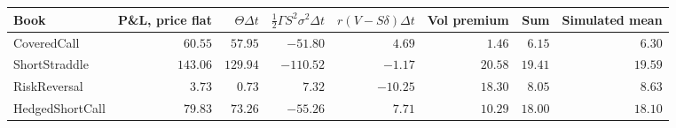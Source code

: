 \begin{tabular}{lrrrrrrr}
\toprule
Book & P\&L, price flat & $\Theta\Delta t$ & $\tfrac12\Gamma S^2\sigma^2\Delta t$ & $r(V-S\delta)\Delta t$ & Vol premium & Sum & Simulated mean \\
\midrule
CoveredCall & $60.55$ & $57.95$ & $-51.80$ & $4.69$ & $1.46$ & $6.15$ & $6.30$ \\
ShortStraddle & $143.06$ & $129.94$ & $-110.52$ & $-1.17$ & $20.58$ & $19.41$ & $19.59$ \\
RiskReversal & $3.73$ & $0.73$ & $7.32$ & $-10.25$ & $18.30$ & $8.05$ & $8.63$ \\
HedgedShortCall & $79.83$ & $73.26$ & $-55.26$ & $7.71$ & $10.29$ & $18.00$ & $18.10$ \\
\bottomrule
\end{tabular}
